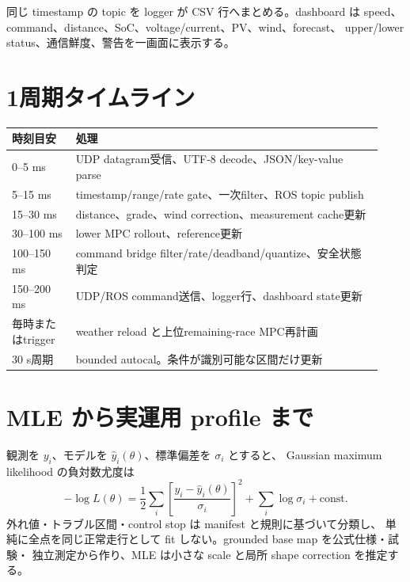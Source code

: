 同じ timestamp の topic を logger が CSV 行へまとめる。dashboard は
speed、command、distance、SoC、voltage/current、PV、wind、forecast、
upper/lower status、通信鮮度、警告を一画面に表示する。


\section{1周期タイムライン}
\begin{longtable}{p{0.16\linewidth}p{0.77\linewidth}}
\toprule
時刻目安 & 処理\\
\midrule
\endhead
0--5 ms & UDP datagram受信、UTF-8 decode、JSON/key-value parse\\
5--15 ms & timestamp/range/rate gate、一次filter、ROS topic publish\\
15--30 ms & distance、grade、wind correction、measurement cache更新\\
30--100 ms & lower MPC rollout、reference更新\\
100--150 ms & command bridge filter/rate/deadband/quantize、安全状態判定\\
150--200 ms & UDP/ROS command送信、logger行、dashboard state更新\\
毎時またはtrigger & weather reload と上位remaining-race MPC再計画\\
30 s周期 & bounded autocal。条件が識別可能な区間だけ更新\\
\bottomrule
\end{longtable}


\section{MLE から実運用 profile まで}
観測を $y_i$、モデルを $\hat y_i(\theta)$、標準偏差を $\sigma_i$ とすると、
Gaussian maximum likelihood の負対数尤度は
\[
 -\log L(\theta)
 =\frac{1}{2}\sum_i\left[
 \frac{y_i-\hat y_i(\theta)}{\sigma_i}\right]^2
 +\sum_i\log\sigma_i+\mathrm{const}.
\]
外れ値・トラブル区間・control stop は manifest と規則に基づいて分類し、
単純に全点を同じ正常走行として fit しない。grounded base map を公式仕様・試験・
独立測定から作り、MLE は小さな scale と局所 shape correction を推定する。

